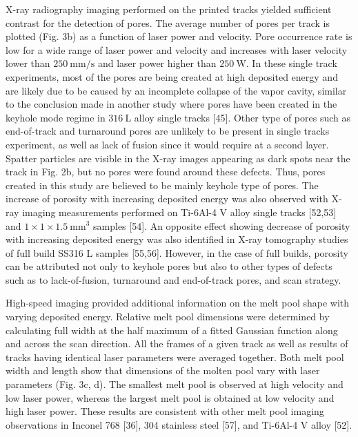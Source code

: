 \documentclass[10pt]{article}
\begin{document}
X-ray radiography imaging performed on the printed tracks yielded sufficient contrast for the detection of pores. The average number of pores per track is plotted (Fig. 3b) as a function of laser power and velocity. Pore occurrence rate is low for a wide range of laser power and velocity and increases with laser velocity lower than $250 \mathrm{~mm} / \mathrm{s}$ and laser power higher than $250 \mathrm{~W}$. In these single track experiments, most of the pores are being created at high deposited energy and are likely due to be caused by an incomplete collapse of the vapor cavity, similar to the conclusion made in another study where pores have been created in the keyhole mode regime in $316 \mathrm{~L}$ alloy single tracks [45]. Other type of pores such as end-of-track and turnaround pores are unlikely to be present in single tracks experiment, as well as lack of fusion since it would require at a second layer. Spatter particles are visible in the X-ray images appearing as dark spots near the track in Fig. 2b, but no pores were found around these defects. Thus, pores created in this study are believed to be mainly keyhole type of pores. The increase of porosity with increasing deposited energy was also observed with X-ray imaging measurements performed on Ti-6Al-4 V alloy single tracks [52,53] and $1 \times 1 \times 1.5 \mathrm{~mm}^{3}$ samples [54]. An opposite effect showing decrease of porosity with increasing deposited energy was also identified in X-ray tomography studies of full build SS316 L samples [55,56]. However, in the case of full builds, porosity can be attributed not only to keyhole pores but also to other types of defects such as to lack-of-fusion, turnaround and end-of-track pores, and scan strategy.

High-speed imaging provided additional information on the melt pool shape with varying deposited energy. Relative melt pool dimensions were determined by calculating full width at the half maximum of a fitted Gaussian function along and across the scan direction. All the frames of a given track as well as results of tracks having identical laser parameters were averaged together. Both melt pool width and length show that dimensions of the molten pool vary with laser parameters (Fig. 3c, d). The smallest melt pool is observed at high velocity and low laser power, whereas the largest melt pool is obtained at low velocity and high laser power. These results are consistent with other melt pool imaging observations in Inconel 768 [36], 304 stainless steel [57], and Ti-6Al-4 V alloy [52].
\end{document}
